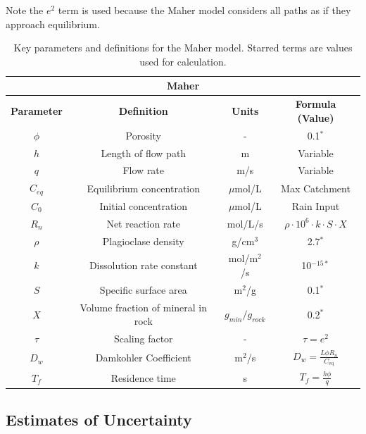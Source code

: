 Note the $e^2$ term is used because the Maher model considers all paths as if they approach equilibrium.

\begin{table}[H]
    \centering
    \renewcommand{\arraystretch}{1.3} %
    \begin{tabular}{|c|c|c|c|}
        \hline  %
        \multicolumn{4}{|c|}{\textbf{Maher}} \\  
        \hline
        \textbf{Parameter} & \textbf{Definition} & \textbf{Units} & \textbf{Formula (Value)} \\
        \hline
        $\phi$ & Porosity & - & 0.1$^*$ \\
        $h$ & Length of flow path & m & Variable \\
        $q$ & Flow rate & m/s & Variable \\
        $C_{eq}$ & Equilibrium concentration & $\mu$mol/L & Max Catchment \\
        $C_0$ & Initial concentration & $\mu$mol/L & Rain Input \\
        $R_n$ & Net reaction rate & mol/L/s & $\rho \cdot 10^6 \cdot k \cdot S \cdot X $ \\
        $\rho$ & Plagioclase density & g/cm$^3$ & 2.7$^*$ \\
        $k$ & Dissolution rate constant & mol/m$^2$/s & 10$^{-15*}$ \\
        $S$ & Specific surface area & m$^2$/g & 0.1$^*$ \\
        $X$ & Volume fraction of mineral in rock & $g_{min}/g_{rock}$& 0.2$^*$ \\
        $\tau$ & Scaling factor & - & $\tau = e^2$ \\
        $D_w$ & Damkohler Coefficient & m$^2$/s & $D_w = \frac{L \phi R_n}{C_{\text{eq}}}$ \\
        $T_f$ & Residence time & s & $T_f = \frac{h \phi}{q}$ \\
        \hline
    \end{tabular}
    \caption{Key parameters and definitions for the Maher model. Starred terms are values used for calculation.}
    \label{tab:maher1}
\end{table}

\FloatBarrier


\subsection{Estimates of Uncertainty}

